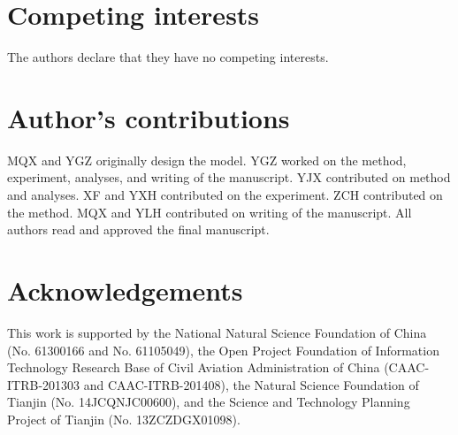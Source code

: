 \documentclass{bmcart}
\begin{document}

\begin{backmatter}

\section*{Competing interests}
The authors declare that they have no competing interests.

\section*{Author's contributions}
MQX and YGZ originally design the model. YGZ worked on the method, experiment, analyses, and writing of the manuscript. YJX  contributed on method and analyses.  XF and YXH contributed on the experiment. ZCH contributed on the method. MQX and YLH contributed on writing of the manuscript. All authors read and approved the final manuscript.

\section*{Acknowledgements}
This work is supported by the National Natural Science Foundation of China (No. 61300166 and No. 61105049), the Open Project Foundation of Information Technology Research Base of Civil Aviation Administration of China (CAAC-ITRB-201303 and CAAC-ITRB-201408), the Natural Science Foundation of Tianjin (No. 14JCQNJC00600), and the Science and Technology Planning Project of Tianjin (No. 13ZCZDGX01098).



\end{backmatter}
\end{document}
